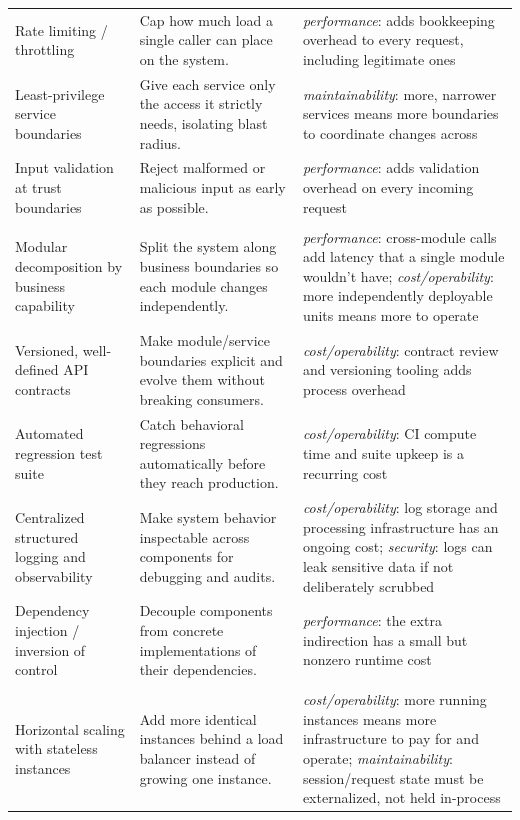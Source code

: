 \documentclass[preprint,12pt,authoryear]{elsarticle}
\renewcommand{\_}{\textunderscore\allowbreak{}}
\begin{document}
{\begin{longtable}{@{}>{\raggedright\arraybackslash}p{1.35in}>{\raggedright\arraybackslash}p{1.65in}>{\raggedright\arraybackslash}p{2.35in}@{}}
Rate limiting / throttling & Cap how much load a single caller can place on the system. & \emph{performance}: adds bookkeeping overhead to every request, including legitimate ones \\
Least-privilege service boundaries & Give each service only the access it strictly needs, isolating blast radius. & \emph{maintainability}: more, narrower services means more boundaries to coordinate changes across \\
Input validation at trust boundaries & Reject malformed or malicious input as early as possible. & \emph{performance}: adds validation overhead on every incoming request \\
\midrule
\multicolumn{3}{@{}l}{\textbf{Maintainability}} \\
\midrule
Modular decomposition by business capability & Split the system along business boundaries so each module changes independently. & \emph{performance}: cross-module calls add latency that a single module wouldn't have; \emph{cost/operability}: more independently deployable units means more to operate \\
Versioned, well-defined API contracts & Make module/service boundaries explicit and evolve them without breaking consumers. & \emph{cost/operability}: contract review and versioning tooling adds process overhead \\
Automated regression test suite & Catch behavioral regressions automatically before they reach production. & \emph{cost/operability}: CI compute time and suite upkeep is a recurring cost \\
Centralized structured logging and observability & Make system behavior inspectable across components for debugging and audits. & \emph{cost/operability}: log storage and processing infrastructure has an ongoing cost; \emph{security}: logs can leak sensitive data if not deliberately scrubbed \\
Dependency injection / inversion of control & Decouple components from concrete implementations of their dependencies. & \emph{performance}: the extra indirection has a small but nonzero runtime cost \\
\midrule
\multicolumn{3}{@{}l}{\textbf{Scalability}} \\
\midrule
Horizontal scaling with stateless instances & Add more identical instances behind a load balancer instead of growing one instance. & \emph{cost/operability}: more running instances means more infrastructure to pay for and operate; \emph{maintainability}: session/request state must be externalized, not held in-process \\

\end{longtable}}
\end{document}
